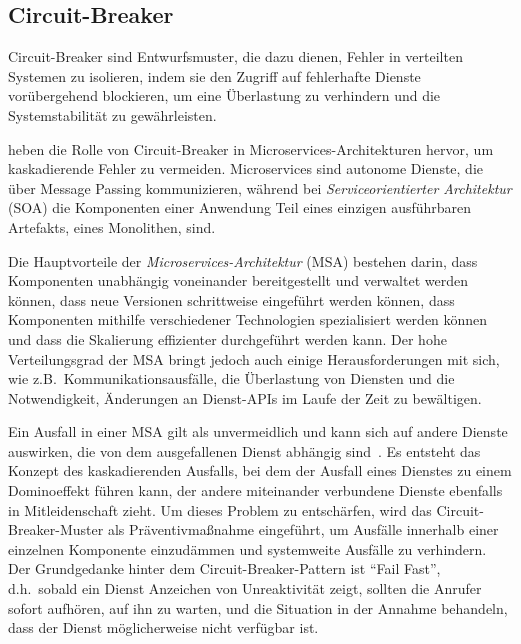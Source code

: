 \subsection{Circuit-Breaker}


Circuit-Breaker sind Entwurfsmuster, die dazu dienen, Fehler in verteilten Systemen zu isolieren,
indem sie den Zugriff auf fehlerhafte Dienste vorübergehend blockieren,
um eine Überlastung zu verhindern und die Systemstabilität zu gewährleisten.

\citet{Montesi.19.09.2016} heben die Rolle von Circuit-Breaker in Microservices-Architekturen hervor,
um kaskadierende Fehler zu vermeiden. %
Microservices sind autonome Dienste, die über Message Passing kommunizieren, %
während bei \textit{Serviceorientierter Architektur} (SOA) die Komponenten einer Anwendung Teil eines
einzigen ausführbaren Artefakts, eines Monolithen, sind.

Die Hauptvorteile der \textit{Microservices-Architektur} (MSA) bestehen darin,
dass Komponenten unabhängig voneinander bereitgestellt und verwaltet werden können,
dass neue Versionen schrittweise eingeführt werden können, dass Komponenten
mithilfe verschiedener Technologien spezialisiert werden können und dass die Skalierung
effizienter durchgeführt werden kann.
Der hohe Verteilungsgrad der MSA bringt jedoch auch einige Herausforderungen mit sich,
wie z.B.\ Kommunikationsausfälle, die Überlastung von Diensten und die Notwendigkeit,
Änderungen an Dienst-APIs im Laufe der Zeit zu bewältigen.

Ein Ausfall in einer MSA gilt als unvermeidlich und kann
sich auf andere Dienste auswirken, die von dem ausgefallenen Dienst abhängig sind~\cite{Haley.28.06.2018,Montesi.19.09.2016}.
Es entsteht das Konzept des kaskadierenden Ausfalls, bei dem der Ausfall eines Dienstes
zu einem Dominoeffekt führen kann, der andere miteinander verbundene Dienste ebenfalls in
Mitleidenschaft zieht.
Um dieses Problem zu entschärfen, wird das Circuit-Breaker-Muster als Präventivmaßnahme eingeführt,
um Ausfälle innerhalb einer einzelnen Komponente einzudämmen und systemweite Ausfälle zu verhindern.
Der Grundgedanke hinter dem Circuit-Breaker-Pattern ist \enquote{Fail Fast}, d.h.\ sobald ein Dienst Anzeichen %
von Unreaktivität zeigt, sollten die Anrufer sofort aufhören, auf ihn zu warten,
und die Situation in der Annahme behandeln, dass der Dienst möglicherweise nicht verfügbar ist.


